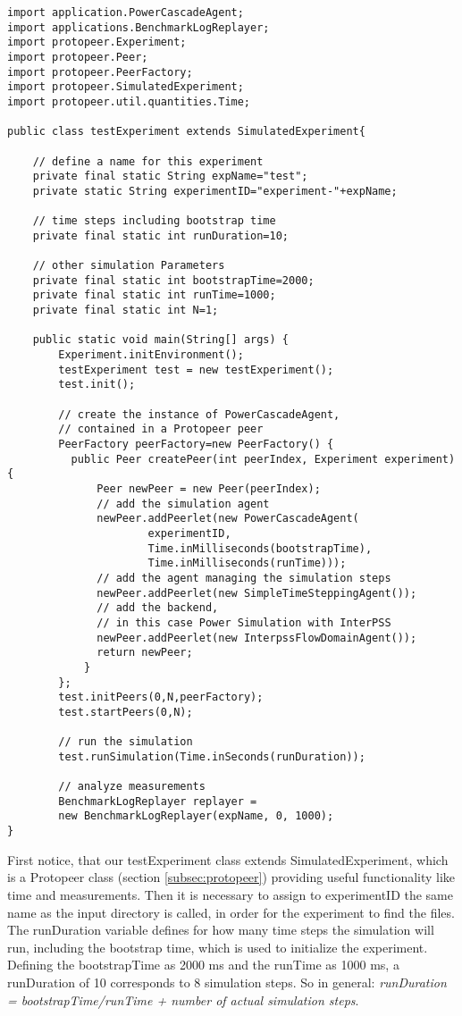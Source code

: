 \documentclass[11pt,fleqn]{book} %
\begin{document}
	\begin{lstlisting}[frame=single] 
import application.PowerCascadeAgent;
import applications.BenchmarkLogReplayer;
import protopeer.Experiment;
import protopeer.Peer;
import protopeer.PeerFactory;
import protopeer.SimulatedExperiment;
import protopeer.util.quantities.Time;

public class testExperiment extends SimulatedExperiment{    

    // define a name for this experiment
    private final static String expName="test";    
    private static String experimentID="experiment-"+expName;
    
    // time steps including bootstrap time
    private final static int runDuration=10;

    // other simulation Parameters
    private final static int bootstrapTime=2000;
    private final static int runTime=1000;
    private final static int N=1;
    
    public static void main(String[] args) {
        Experiment.initEnvironment();
        testExperiment test = new testExperiment();
        test.init();
        
        // create the instance of PowerCascadeAgent, 
        // contained in a Protopeer peer
        PeerFactory peerFactory=new PeerFactory() {
          public Peer createPeer(int peerIndex, Experiment experiment){
              Peer newPeer = new Peer(peerIndex);
              // add the simulation agent
              newPeer.addPeerlet(new PowerCascadeAgent(
                      experimentID, 
                      Time.inMilliseconds(bootstrapTime),
                      Time.inMilliseconds(runTime)));
              // add the agent managing the simulation steps
              newPeer.addPeerlet(new SimpleTimeSteppingAgent());
              // add the backend, 
              // in this case Power Simulation with InterPSS
              newPeer.addPeerlet(new InterpssFlowDomainAgent());
              return newPeer;
            }
        };
        test.initPeers(0,N,peerFactory);
        test.startPeers(0,N);

        // run the simulation
        test.runSimulation(Time.inSeconds(runDuration));

        // analyze measurements
        BenchmarkLogReplayer replayer =
        new BenchmarkLogReplayer(expName, 0, 1000);
}
	\end{lstlisting}
First notice, that our testExperiment class extends SimulatedExperiment, which is a Protopeer class (section \ref{subsec:protopeer}) providing useful functionality like time and measurements. Then it is necessary to assign to experimentID the same name as the input directory is called, in order for the experiment to find the files. The runDuration variable defines for how many time steps the simulation will run, including the bootstrap time, which is used to initialize the experiment. Defining the bootstrapTime as 2000 ms and the runTime as 1000 ms, a runDuration of 10 corresponds to 8 simulation steps. So in general: \textit{runDuration = bootstrapTime/runTime + number of actual simulation steps}. 
\end{document}
